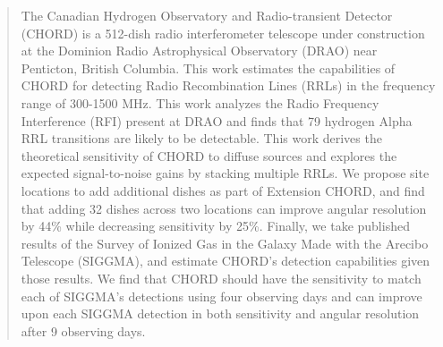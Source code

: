 





\normalsize

\newpage


\begin{abstract}                %
The Canadian Hydrogen Observatory and Radio-transient Detector \\(CHORD) is a 512-dish radio interferometer telescope under construction at the Dominion Radio Astrophysical Observatory (DRAO) near Penticton, British Columbia. This work estimates the capabilities of CHORD for detecting Radio Recombination Lines (RRLs) in the frequency range of 300-1500 MHz. This work analyzes the Radio Frequency Interference (RFI) present at DRAO and finds that 79 hydrogen Alpha RRL transitions are likely to be detectable. This work derives the theoretical sensitivity of CHORD to diffuse sources and explores the expected signal-to-noise gains by stacking multiple RRLs. We propose site locations to add additional dishes as part of Extension CHORD, and find that adding 32 dishes across two locations can improve angular resolution by 44\% while decreasing sensitivity by 25\%. Finally, we take published results of the Survey of Ionized Gas in the Galaxy Made with the Arecibo Telescope (SIGGMA), and estimate CHORD's detection capabilities given those results. We find that CHORD should have the sensitivity to match each of SIGGMA's detections using four observing days and can improve upon each SIGGMA detection in both sensitivity and angular resolution after 9 observing days.



\end{abstract}

